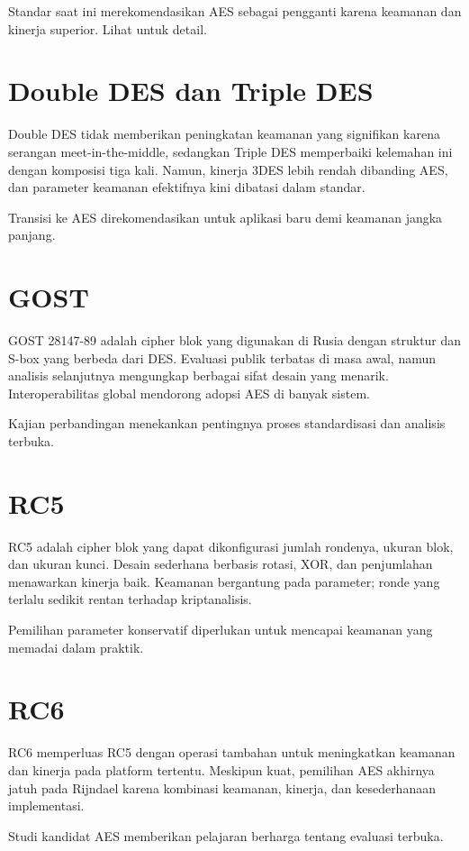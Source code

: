 \documentclass[../main.tex]{subfiles}
\begin{document}
Standar saat ini merekomendasikan AES sebagai pengganti karena keamanan dan kinerja superior. Lihat \textcite{fips197} untuk detail.

\section{Double DES dan Triple DES}
Double DES tidak memberikan peningkatan keamanan yang signifikan karena serangan meet-in-the-middle, sedangkan Triple DES memperbaiki kelemahan ini dengan komposisi tiga kali. Namun, kinerja 3DES lebih rendah dibanding AES, dan parameter keamanan efektifnya kini dibatasi dalam standar.

Transisi ke AES direkomendasikan untuk aplikasi baru demi keamanan jangka panjang.

\section{GOST}
GOST 28147-89 adalah cipher blok yang digunakan di Rusia dengan struktur dan S-box yang berbeda dari DES. Evaluasi publik terbatas di masa awal, namun analisis selanjutnya mengungkap berbagai sifat desain yang menarik. Interoperabilitas global mendorong adopsi AES di banyak sistem.

Kajian perbandingan menekankan pentingnya proses standardisasi dan analisis terbuka.

\section{RC5}
RC5 adalah cipher blok yang dapat dikonfigurasi jumlah rondenya, ukuran blok, dan ukuran kunci. Desain sederhana berbasis rotasi, XOR, dan penjumlahan menawarkan kinerja baik. Keamanan bergantung pada parameter; ronde yang terlalu sedikit rentan terhadap kriptanalisis.

Pemilihan parameter konservatif diperlukan untuk mencapai keamanan yang memadai dalam praktik.

\section{RC6}
RC6 memperluas RC5 dengan operasi tambahan untuk meningkatkan keamanan dan kinerja pada platform tertentu. Meskipun kuat, pemilihan AES akhirnya jatuh pada Rijndael karena kombinasi keamanan, kinerja, dan kesederhanaan implementasi.

Studi kandidat AES memberikan pelajaran berharga tentang evaluasi terbuka.
\end{document}
